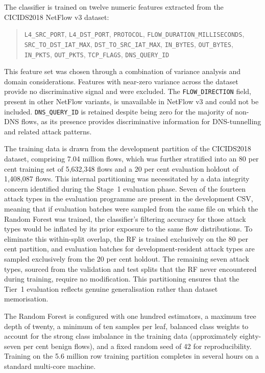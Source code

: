 The classifier is trained on twelve numeric features extracted from the CICIDS2018 NetFlow v3 dataset:

\begin{quote}
\small\raggedright
\texttt{L4\_SRC\_PORT}, \texttt{L4\_DST\_PORT}, \texttt{PROTOCOL},
\texttt{FLOW\_DURATION\_MILLI\-SECONDS},
\texttt{SRC\_TO\_DST\_IAT\_MAX}, \texttt{DST\_TO\_SRC\_IAT\_MAX},
\texttt{IN\_BYTES}, \texttt{OUT\_BYTES}, \texttt{IN\_PKTS},
\texttt{OUT\_PKTS}, \texttt{TCP\_FLAGS}, \texttt{DNS\_QUERY\_ID}
\end{quote}

\noindent This feature set was chosen through a combination of variance analysis and domain considerations. Features with near-zero variance across the dataset provide no discriminative signal and were excluded. The \texttt{FLOW\_DIRECTION} field, present in other NetFlow variants, is unavailable in NetFlow v3 and could not be included. \texttt{DNS\_QUERY\_ID} is retained despite being zero for the majority of non-DNS flows, as its presence provides discriminative information for DNS-tunnelling and related attack patterns.

The training data is drawn from the development partition of the CICIDS2018 dataset, comprising 7.04 million flows, which was further stratified into an 80 per cent training set of 5,632,348 flows and a 20 per cent evaluation holdout of 1,408,087 flows. This internal partitioning was necessitated by a data integrity concern identified during the Stage~1 evaluation phase. Seven of the fourteen attack types in the evaluation programme are present in the development CSV, meaning that if evaluation batches were sampled from the same file on which the Random Forest was trained, the classifier's filtering accuracy for those attack types would be inflated by its prior exposure to the same flow distributions. To eliminate this within-split overlap, the RF is trained exclusively on the 80 per cent partition, and evaluation batches for development-resident attack types are sampled exclusively from the 20 per cent holdout. The remaining seven attack types, sourced from the validation and test splits that the RF never encountered during training, require no modification. This partitioning ensures that the Tier~1 evaluation reflects genuine generalisation rather than dataset memorisation.

The Random Forest is configured with one hundred estimators, a maximum tree depth of twenty, a minimum of ten samples per leaf, balanced class weights to account for the strong class imbalance in the training data (approximately eighty-seven per cent benign flows), and a fixed random seed of 42 for reproducibility. Training on the 5.6 million row training partition completes in several hours on a standard multi-core machine.

